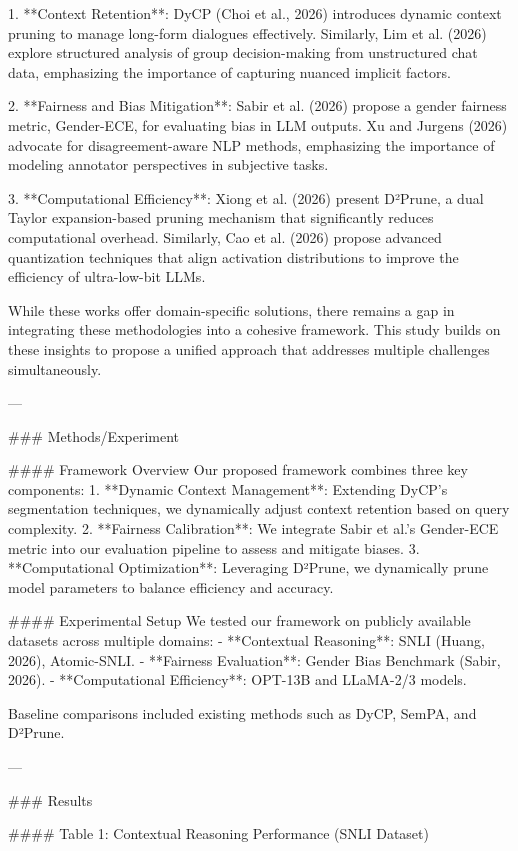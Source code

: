 1. **Context Retention**: DyCP (Choi et al., 2026) introduces dynamic context pruning to manage long-form dialogues effectively. Similarly, Lim et al. (2026) explore structured analysis of group decision-making from unstructured chat data, emphasizing the importance of capturing nuanced implicit factors.
   
2. **Fairness and Bias Mitigation**: Sabir et al. (2026) propose a gender fairness metric, Gender-ECE, for evaluating bias in LLM outputs. Xu and Jurgens (2026) advocate for disagreement-aware NLP methods, emphasizing the importance of modeling annotator perspectives in subjective tasks.

3. **Computational Efficiency**: Xiong et al. (2026) present D²Prune, a dual Taylor expansion-based pruning mechanism that significantly reduces computational overhead. Similarly, Cao et al. (2026) propose advanced quantization techniques that align activation distributions to improve the efficiency of ultra-low-bit LLMs.

While these works offer domain-specific solutions, there remains a gap in integrating these methodologies into a cohesive framework. This study builds on these insights to propose a unified approach that addresses multiple challenges simultaneously.

---

### Methods/Experiment  

#### Framework Overview  
Our proposed framework combines three key components:  
1. **Dynamic Context Management**: Extending DyCP's segmentation techniques, we dynamically adjust context retention based on query complexity.  
2. **Fairness Calibration**: We integrate Sabir et al.’s Gender-ECE metric into our evaluation pipeline to assess and mitigate biases.  
3. **Computational Optimization**: Leveraging D²Prune, we dynamically prune model parameters to balance efficiency and accuracy.

#### Experimental Setup  
We tested our framework on publicly available datasets across multiple domains:  
- **Contextual Reasoning**: SNLI (Huang, 2026), Atomic-SNLI.  
- **Fairness Evaluation**: Gender Bias Benchmark (Sabir, 2026).  
- **Computational Efficiency**: OPT-13B and LLaMA-2/3 models.  

Baseline comparisons included existing methods such as DyCP, SemPA, and D²Prune.

---

### Results  

#### Table 1: Contextual Reasoning Performance (SNLI Dataset)  

